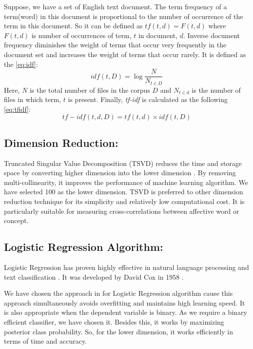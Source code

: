 \documentclass[10pt, conference]{IEEEtran}
\begin{document}
	Suppose, we have a set of English text document. The term frequency of a term(word) in this document is proportional to the number of occurrence of the term in this document. So it can be defined as $tf(t,d) = F(t,d)$ where $F(t,d)$ is number of occurrences of term, $t$ in document, $d$. Inverse document frequency diminishes the weight of terms that occur very frequently in the document set and increases the weight of terms that occur rarely. It is defined as the \eqref{eq:idf}:
	\begin{equation}
	idf(t, D) = \log \dfrac{N} {N_{t\in D}}
	\label{eq:idf}
	\end{equation}
	Here, $N$ is the total number of files in the corpus $D$ and $N_{t\in d}$ is the number of files in which term, $t$ is present. Finally, \textit{tf-idf} is calculated as the following \eqref{eq:tfidf}:
	\begin{equation}
		tf-idf(t, d, D) = tf(t, d) \times idf(t, D)
		\label{eq:tfidf}
	\end{equation}
	
	\subsection{\textbf{Dimension Reduction:}}
	Truncated Singular Value Decomposition (TSVD) reduces the time and storage space by converting higher dimension into the lower dimension \cite{b23}. By removing multi-collinearity, it improves the performance of machine learning algorithm. We have selected 100 as the lower dimension. TSVD is preferred to other dimension reduction technique for its simplicity and relatively low computational cost. It is particularly suitable for measuring cross-correlations between affective word or concept.
	
	\subsection{\textbf{Logistic Regression Algorithm:}} Logistic Regression has proven highly effective in natural language processing and text classification \cite{b20, b21}. It was developed by David Cox in 1958 \cite{b22}.
	
	We have chosen the approach in \cite{b20} for Logistic Regression algorithm cause this approach simultaneously avoids overfitting and maintains high learning speed. It is also appropriate when the dependent variable is binary. As we require a binary efficient classifier, we have chosen it. Besides this, it works by maximizing posterior class probability. So, for the lower dimension, it works efficiently in terms of time and accuracy.
	
\end{document}
